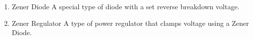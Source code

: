 \documentclass{IEEEtran}
\begin{document}
\begin{enumerate}
\\
\\

\\
\item Zener Diode
  \subitem A special type of diode with a set reverse breakdown voltage.\\
\item Zener Regulator
  \subitem A type of power regulator that clamps voltage using a Zener Diode.\\
\end{enumerate}
\end{document}
